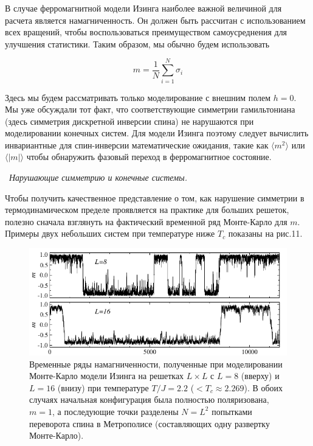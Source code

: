 \documentclass[11pt]{article}
\begin{document}
В случае ферромагнитной модели Изинга наиболее важной величиной для расчета является намагниченность. Он должен быть рассчитан с использованием всех вращений, чтобы воспользоваться преимуществом самоусреднения для улучшения статистики. Таким образом, мы обычно будем использовать

\begin{equation}
m=\frac{1}{N}\sum\limits_{i=1}^N \sigma_i
\label{eq_45}
\end{equation}

Здесь мы будем рассматривать только моделирование с внешним полем $h = 0$. Мы уже обсуждали тот факт, что соответствующие симметрии гамильтониана (здесь симметрия дискретной инверсии спина) не нарушаются при моделировании конечных систем. Для модели Изинга поэтому следует вычислить инвариантные для спин-инверсии математические ожидания, такие как $\langle m^2 \rangle$ или $\langle |m| \rangle$  чтобы обнаружить фазовый переход в ферромагнитное состояние.


~\emph{Нарушающие симметрию и конечные системы.}

Чтобы получить качественное представление о том, как нарушение симметрии в термодинамическом пределе проявляется на практике для больших решеток, полезно сначала взглянуть на фактический временной ряд Монте-Карло для $m$. Примеры двух небольших систем при температуре ниже $T_c$ показаны на рис.11. 

\begin{figure}[htp]
\centering
\includegraphics[scale=0.5]{fig11}
\caption{Временные ряды намагниченности, полученные при моделировании Монте-Карло модели Изинга на решетках $L × L$ с $L = 8$ (вверху) и $L = 16$ (внизу) при температуре $T / J = 2.2$ ($<T_c \approx 2.269$). В обоих случаях начальная конфигурация была полностью поляризована, $m = 1$, а последующие точки разделены $N = L^2$ попытками переворота спина в Метрополисе (составляющих одну развертку Монте-Карло).}
\label{}
\end{figure}
\end{document}
